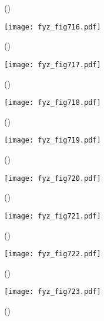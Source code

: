    \begin{figure}[ht!]
      \centering
      \label{fyz:fig715}
      \caption{
               (\cite[s.~748]{Feynman02})}
    \end{figure}

    \begin{figure}[ht!] %
      \centering
      \texttt{[image: fyz\_fig716.pdf]}
      \caption{
               (\cite[s.~707]{Feynman02})}
      \label{fyz:fig716}
    \end{figure}

    \begin{figure}[ht!] %
      \centering
      \texttt{[image: fyz\_fig717.pdf]}
      \caption{
               (\cite[s.~707]{Feynman02})}
      \label{fyz:fig717}
    \end{figure}

    \begin{figure}[ht!] %
      \centering
      \texttt{[image: fyz\_fig718.pdf]}
      \caption{
               (\cite[s.~707]{Feynman02})}
      \label{fyz:fig718}
    \end{figure}

    \begin{figure}[ht!] %
      \centering
      \texttt{[image: fyz\_fig719.pdf]}
      \caption{
               (\cite[s.~707]{Feynman02})}
      \label{fyz:fig719}
    \end{figure}

    \begin{figure}[ht!] %
      \centering
      \texttt{[image: fyz\_fig720.pdf]}
      \caption{
               (\cite[s.~707]{Feynman02})}
      \label{fyz:fig720}
    \end{figure}

    \begin{figure}[ht!] %
      \centering
      \texttt{[image: fyz\_fig721.pdf]}
      \caption{
               (\cite[s.~707]{Feynman02})}
      \label{fyz:fig721}
    \end{figure}

    \begin{figure}[ht!] %
      \centering
      \texttt{[image: fyz\_fig722.pdf]}
      \caption{
               (\cite[s.~707]{Feynman02})}
      \label{fyz:fig722}
    \end{figure}

    \begin{figure}[ht!] %
      \centering
      \texttt{[image: fyz\_fig723.pdf]}
      \caption{
               (\cite[s.~707]{Feynman02})}
      \label{fyz:fig723}
    \end{figure}

